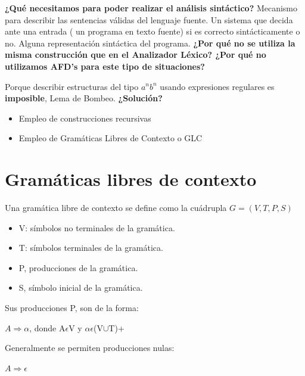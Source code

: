 \textbf{¿Qué necesitamos para poder realizar el análisis sintáctico?}
\newline
Mecanismo para describir las sentencias válidas del lenguaje fuente.
Un sistema que decida ante una entrada ( un programa en texto fuente) si es correcto sintácticamente o no.
\newline
Alguna representación sintáctica del programa.
\newline
\textbf{¿Por qué no se utiliza la misma construcción que en el Analizador Léxico? ¿Por qué no utilizamos AFD's para este tipo de situaciones?}

Porque describir estructuras del tipo $a^nb^n$ usando expresiones regulares es \textbf{imposible}, Lema de Bombeo.
\newline
\newline
\textbf{¿Solución?}

\begin{itemize}
	\item Empleo de construcciones recursivas
	\item Empleo de Gramáticas Libres de Contexto o GLC
\end{itemize}


\section{Gramáticas libres de contexto}

Una gramática libre de contexto se define como la cuádrupla	$G =(V,T,P,S)$
	\begin{itemize}
		\item V: símbolos no terminales de la gramática.
		\item T: símbolos terminales de la gramática.
		\item P, producciones de la gramática.
		\item S, símbolo inicial de la gramática.
	\end{itemize}
Sus producciones P, son de la forma:
\newline
\begin{center}
	$A\Rightarrow\alpha$, donde A$\epsilon$V y $\alpha\epsilon$(V$\cup$T)+
\end{center}
Generalmente se permiten producciones nulas:
\begin{center}
	$A\Rightarrow\epsilon$
\end{center}
